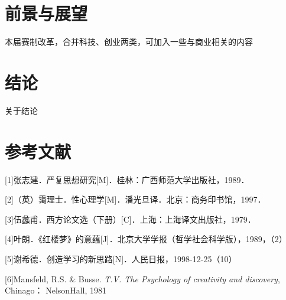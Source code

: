 \documentclass[zihao=-4]{ctexart}
\begin{document}
\begin{spacing}{1.5}
\section{前景与展望}
本届赛制改革，合并科技、创业两类，可加入一些与商业相关的内容

\section{结论}
关于结论

\end{spacing}

\newpage

\section*{参考文献}
[1]张志建．严复思想研究[M]．桂林：广西师范大学出版社，1989． 

[2]（英）霭理士．性心理学[M]．潘光旦译．北京：商务印书馆，1997．


[3]伍蠡甫．西方论文选（下册）[C]．上海：上海译文出版社，1979．

[4]叶朗．《红楼梦》的意蕴[J]．北京大学学报（哲学社会科学版），1989，（2）

[5]谢希德．创造学习的新思路[N]．人民日报，1998-12-25（10）

[6]Mansfeld, R.S. \& Busse. \textit{T.V. The Psychology of creativity and discovery}, Chinago：
NelsonHall, 1981




% 
\end{document}
